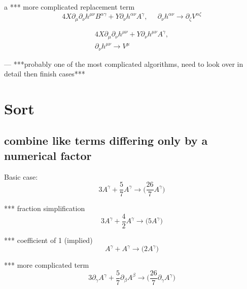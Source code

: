 \documentclass{article}
\def\){\Big)}
\def\({\Big(}
\begin{document}
{\color{blue}

a
{\color{red}
*** more complicated replacement term
\begin{equation}
4X \partial_{\mu} \partial_{\nu}h^{\mu \nu} B^{\alpha \gamma} +Y \partial_{\nu}h^{\alpha \nu} A^{\gamma} , \; \; \; \; \;
 \partial_{\nu}h^{\alpha \nu} \rightarrow \partial_{\zeta} V^{\alpha \zeta} 
  \end{equation}
}

{\color{red}
\begin{multline}
4X \partial_{\mu} \partial_{\nu}h^{\mu \nu} +Y \partial_{\nu}h^{\mu \nu} A^{\gamma} , \\
 \partial_{\nu}h^{\mu \nu} \rightarrow  V^{\mu} 
\end{multline}
}

}

— ***probably one of the most complicated algorithms, need to look over in detail then finish cases***\\





\section{Sort}


\subsection{ combine like terms differing only by a numerical factor}

Basic case:
\begin{equation}
3A^{\gamma} + \frac{5}{7} A^{\gamma} \rightarrow 
\(\frac{26}{7} A^{\gamma} \)
\end{equation}

*** fraction simplification
\begin{equation}
3A^{\gamma} + \frac{4}{2} A^{\gamma}  \rightarrow 
\(5 A^{\gamma} \)
\end{equation}

*** coefficient of 1 (implied)
\begin{equation}
A^{\gamma} + A^{\gamma} \rightarrow 
\(2 A^{\gamma} \)
\end{equation}

*** more complicated term
\begin{equation}
3\partial_{\gamma}A^{\gamma} + \frac{5}{7} \partial_{\beta}A^{\beta} \rightarrow 
\(\frac{26}{7} \partial_{\gamma}A^{\gamma} \)
\end{equation}
\end{document}
